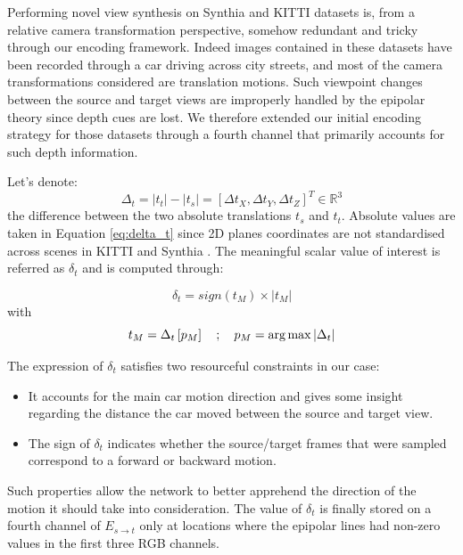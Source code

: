 Performing novel view synthesis on Synthia \citep{ros2016synthia} and KITTI \citep{geiger2012we} datasets is, from a relative camera transformation perspective, somehow redundant and tricky through our encoding framework. Indeed images contained in these datasets have been recorded through a car driving across city streets, and most of the camera transformations considered are translation motions. Such viewpoint changes between the source and target views are improperly handled by the epipolar theory since depth cues are lost. We therefore extended our initial encoding strategy for those datasets through a fourth channel that primarily accounts for such depth information.

Let's denote:
\begin{equation}
    \Delta_{t}= |t_{t}| - |t_{s}| = \left[\Delta t_{X},\Delta t_{Y},\Delta t_{Z} \right]^{T} \in \mathbb{R}^3
    \label{eq:delta_t}
\end{equation}
the difference between the two absolute translations $t_s$ and $t_t$. Absolute values are taken in Equation \eqref{eq:delta_t} since 2D planes coordinates are not standardised across scenes in KITTI \citep{geiger2012we} and Synthia \citep{ros2016synthia}. The meaningful scalar value of interest is referred as $\delta_{t}$ and is computed through:
 
 \begin{equation}
 \label{eq:2}
     \delta_{t} = sign(t_{M}) \times| t_{M} |
 \end{equation}
 with 
 \begin{equation}
    t_{M} = \Delta_{t}\left[p_{M}\right] \quad ; \quad p_{M}= \argmax|\Delta_{t}|
\end{equation}

The expression of $\delta_{t}$ satisfies two resourceful constraints in our case: 

\begin{itemize}
    \item It accounts for the main car motion direction and gives some insight regarding the distance the car moved between the source and target view.
    \item The sign of $\delta_{t}$ indicates whether the source/target frames that were sampled correspond to a forward or backward motion. 
\end{itemize}
Such properties allow the network to better apprehend the direction of the motion it should take into consideration. The value of  $\delta_{t}$ is finally stored on a fourth channel of $E_{s\xrightarrow{}t}$ only at locations where the epipolar lines had non-zero values in the first three RGB channels. 

